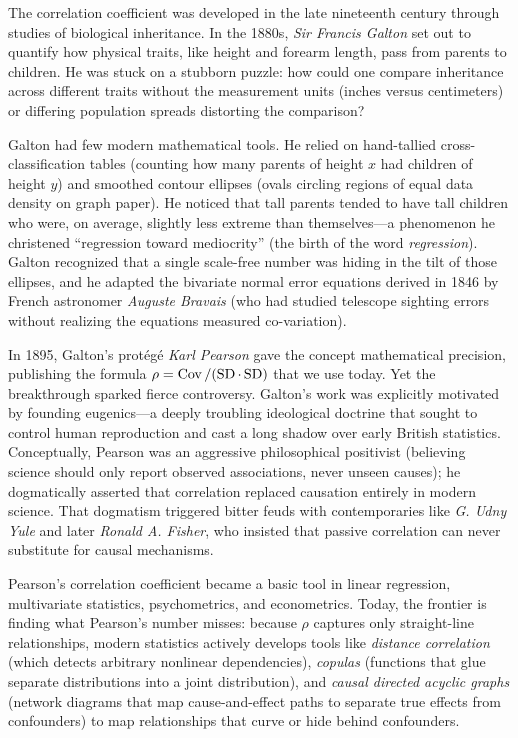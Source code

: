 \begin{historybox}
The correlation coefficient was developed in the late nineteenth century through studies of biological inheritance. In the 1880s, \emph{Sir Francis Galton} set out to quantify how physical traits, like height and forearm length, pass from parents to children. He was stuck on a stubborn puzzle: how could one compare inheritance across different traits without the measurement units (inches versus centimeters) or differing population spreads distorting the comparison? 

Galton had few modern mathematical tools. He relied on hand-tallied cross-classification tables (counting how many parents of height $x$ had children of height $y$) and smoothed contour ellipses (ovals circling regions of equal data density on graph paper). He noticed that tall parents tended to have tall children who were, on average, slightly less extreme than themselves---a phenomenon he christened ``regression toward mediocrity'' (the birth of the word \emph{regression}). Galton recognized that a single scale-free number was hiding in the tilt of those ellipses, and he adapted the bivariate normal error equations derived in 1846 by French astronomer \emph{Auguste Bravais} (who had studied telescope sighting errors without realizing the equations measured co-variation). 

In 1895, Galton's prot\'eg\'e \emph{Karl Pearson} gave the concept mathematical precision, publishing the formula $\rho = \operatorname{Cov} / (\operatorname{SD}\cdot\operatorname{SD})$ that we use today. Yet the breakthrough sparked fierce controversy. Galton's work was explicitly motivated by founding eugenics---a deeply troubling ideological doctrine that sought to control human reproduction and cast a long shadow over early British statistics. Conceptually, Pearson was an aggressive philosophical positivist (believing science should only report observed associations, never unseen causes); he dogmatically asserted that correlation replaced causation entirely in modern science. That dogmatism triggered bitter feuds with contemporaries like \emph{G. Udny Yule} and later \emph{Ronald A. Fisher}, who insisted that passive correlation can never substitute for causal mechanisms.

Pearson's correlation coefficient became a basic tool in linear regression, multivariate statistics, psychometrics, and econometrics. Today, the frontier is finding what Pearson's number misses: because $\rho$ captures only straight-line relationships, modern statistics actively develops tools like \emph{distance correlation} (which detects arbitrary nonlinear dependencies), \emph{copulas} (functions that glue separate distributions into a joint distribution), and \emph{causal directed acyclic graphs} (network diagrams that map cause-and-effect paths to separate true effects from confounders) to map relationships that curve or hide behind confounders.
\end{historybox}

